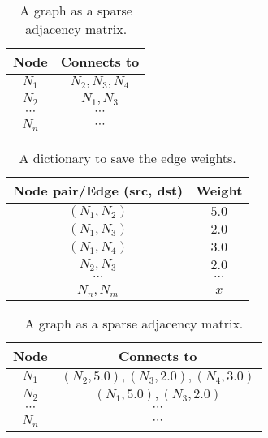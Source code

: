 
  \begin{table}[H]
    \begin{center}
      \begin{tabular}{c|c}
        Node & Connects to\\
        \hline
        $N_1$ & $N_2, N_3, N_4$\\
        $N_2$ & $N_1, N_3$\\
        $\cdots$ & $\cdots$\\
        $N_n$ & $\cdots$
      \end{tabular}

    \end{center}
    \caption{A graph as a sparse adjacency matrix.}
    \label{table:sparse_matrix_1}
  \end{table}



  \begin{table}[H]
    \begin{center}
      \begin{tabular}{c|c}
        Node pair/Edge (src, dst) & Weight\\
        \hline
        $(N_1, N_2)$ & $5.0$\\
        $(N_1, N_3)$ & $2.0$\\
        $(N_1, N_4)$ & $3.0$\\
        $N_2, N_3$ & $2.0$\\
        $\cdots$ & $\cdots$\\
        $N_n, N_m$ & $x$
      \end{tabular}

    \end{center}
    \caption{A dictionary to save the edge weights.}
    \label{table:sparse_matrix_weights}
  \end{table}



  \begin{table}[H]
    \begin{center}
      \begin{tabular}{c|c}
        Node & Connects to\\
        \hline
        $N_1$ & $(N_2, 5.0), (N_3, 2.0), (N_4, 3.0)$\\
        $N_2$ & $(N_1, 5.0), (N_3, 2.0)$\\
        $\cdots$ & $\cdots$\\
        $N_n$ & $\cdots$
      \end{tabular}

    \end{center}
    \caption{A graph as a sparse adjacency matrix.}
    \label{table:sparse_matrix_2}
  \end{table}
